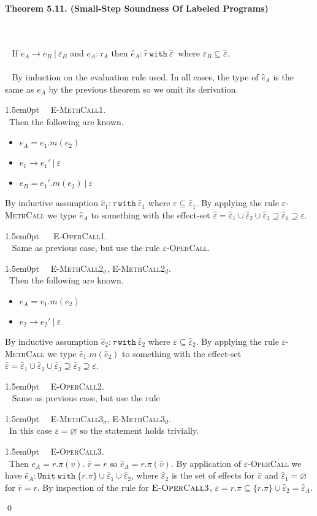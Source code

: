 \documentclass{llncs}
\newcommand{\keywadj}[1]{\mathtt{#1}}
\newcommand{\keyw}[1]{\keywadj{#1}~}
\newcommand{\thm}[3]{
	\begin{large}
		\bf{#1}
	\end{large} \\\\
	\fbox{Statement.} ~ #2
	\fbox{Proof.}~ #3 \qed
}
\newcommand{\proofcase}[2]{
	\begin{adjustwidth}{1.5em}{0pt}
		\fbox{Case.}~~#1. \\ ~#2
	\end{adjustwidth}
}
\begin{document}
\thm{Theorem 5.11. (Small-Step Soundness Of Labeled Programs)}
{If $e_A \longrightarrow e_B~|~\varepsilon_B$ and $e_A : \tau_A$ then $\hat e_A : \hat \tau~\keyw{with ~\hat \varepsilon}$ where $\varepsilon_B \subseteq \hat \varepsilon$.\\\\}
{By induction on the evaluation rule used. In all cases, the type of $\hat e_A$ is the same as $e_A$ by the previous theorem so we omit its derivation.

\proofcase{\textsc{E-MethCall1}}
{Then the following are known.
\begin{itemize}
	\item $e_A = e_1.m(e_2)$
	\item $e_1 \rightarrow e_1'~|~\varepsilon$
	\item $e_B = e_1'.m(e_2)~|~\varepsilon$
\end{itemize}
By inductive assumption $\hat e_1 : \tau~ \keyw{with} \hat \varepsilon_1$ where $\varepsilon \subseteq \hat \varepsilon_1$. By applying the rule \textsc{$\varepsilon$-MethCall} we type $\hat e_A$ to something with the effect-set $\hat \varepsilon = \hat \varepsilon_1 \cup \hat \varepsilon_2 \cup \hat \varepsilon_3 \supseteq \hat \varepsilon_1 \supseteq \varepsilon$.
}

\proofcase{ \textsc{E-OperCall1}}
{
	Same as previous case, but use the rule \textsc{$\varepsilon$-OperCall}.
}

\proofcase{\textsc{E-MethCall2$_\sigma$}, \textsc{E-MethCall2$_d$}}
{Then the following are known.
\begin{itemize}
	\item $e_A = v_1.m(e_2)$
	\item $e_2 \longrightarrow e_2'~|~\varepsilon$
\end{itemize}
By inductive assumption $\hat e_2 : \tau~ \keyw{with} \hat \varepsilon_2$ where $\varepsilon \subseteq \hat \varepsilon_2$. By applying the rule \textsc{$\varepsilon$-MethCall} we type $\hat e_1.m(\hat e_2)$ to something with the effect-set $\hat \varepsilon = \hat \varepsilon_1 \cup \hat \varepsilon_2 \cup \hat \varepsilon_3 \supseteq \hat \varepsilon_2 \supseteq \varepsilon$.
}

\proofcase{\textsc{E-OperCall2}} {
	Same as previous case, but use the rule
}

\proofcase{\textsc{E-MethCall3$_\sigma$}, \textsc{E-MethCall3$_d$}}
{In this case $\varepsilon = \varnothing$ so the statement holds trivially.
}

\proofcase{\textsc{E-OperCall3}}
{Then $e_A = r.\pi(v)$. $\hat r = r$ so $\hat e_A = r.\pi(\hat v)$. By application of \textsc{$\varepsilon$-OperCall} we have $\hat e_A : \keyw{Unit~with} \{ r.\pi \} \cup \hat \varepsilon_1 \cup \hat \varepsilon_2$, where $\hat \varepsilon_2$ is the set of effects for $\hat v$ and $\hat \varepsilon_1 = \varnothing$ for $\hat r = r$. By inspection of the rule for $\textsc{E-OperCall3}$, $\varepsilon = r.\pi \subseteq \{ r.\pi \} \cup \hat \varepsilon_2 = \hat \varepsilon_A$.
}
}
\end{document}

